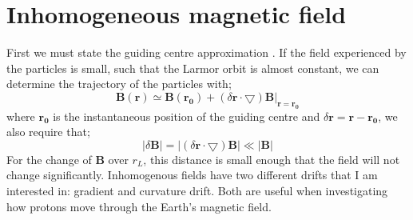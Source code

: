 \documentclass[14paper,11pt,hidelinks]{article}
\begin{document}
\section{Inhomogeneous magnetic field}
First we must state the guiding centre approximation  \citep{boyd_physics_2003}. If the field experienced by the particles is small, such that the Larmor orbit is almost constant, we can determine the trajectory of the particles with;
\begin{equation}
\mathbf{B(r)}\simeq  \mathbf{B(r_0)}+\left(\delta\mathbf{r}\cdot \bigtriangledown\right)\mathbf{B}|_{\mathbf{r}=\mathbf{r_0}}
\end{equation}
where \begin{math} \mathbf{r_0} \end{math} is the instantaneous position of the guiding centre and \begin{math} \delta\mathbf{r}=\mathbf{r}-\mathbf{r_0}\end{math}, we also require that;
\begin{equation}
|\delta\mathbf{B}|=|\left(\delta\mathbf{r}\cdot \bigtriangledown\right)\mathbf{B}|\ll|\mathbf{B}|
\end{equation}
For the change of \textbf{B} over \begin{math} r_L \end{math}, this distance is small enough that the field will not change significantly. Inhomogenous fields have two different drifts that I am interested in: gradient and curvature drift. Both are useful when investigating how protons move through the Earth's magnetic field. 


\end{document}
